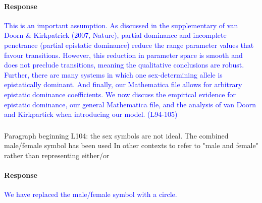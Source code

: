 \documentclass[10pt,letterpaper]{article}
\begin{document}
\noindent\paragraph{Response}
\textcolor{blue}{
This is an important assumption.
As discussed in the supplementary of van Doorn \& Kirkpatrick (2007, Nature), partial dominance and incomplete penetrance (partial epistatic dominance) reduce the range parameter values that favour transitions.
However, this reduction in parameter space is smooth and does not preclude transitions, meaning the qualitative conclusions are robust.
Further, there are many systems in which one sex-determining allele is epistatically dominant.
And finally, our Mathematica file allows for arbitrary epistatic dominance coefficients.
We now discuss the empirical evidence for epistatic dominance, our general Mathematica file, and the analysis of van Doorn and Kirkpartick when introducing our model. (L94-105)
}
%

\noindent\subsubsection{}
Paragraph beginning L104: the sex symbols are not ideal. The combined male/female symbol has been used In other contexts to refer to "male and female" rather than representing either/or

\noindent\paragraph{Response}
\textcolor{blue}{We have replaced the male/female symbol with a circle.}
\end{document}
